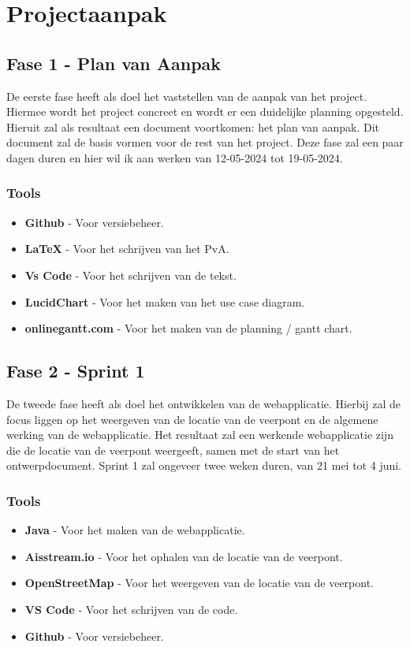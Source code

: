 \documentclass{article}
\begin{document}
\section{Projectaanpak}
\subsection{Fase 1 - Plan van Aanpak}
De eerste fase heeft als doel het vaststellen van de aanpak van het project. Hiermee wordt het project concreet en wordt er een duidelijke planning opgesteld.  
Hieruit zal als resultaat een document voortkomen: het plan van aanpak. Dit document zal de basis vormen voor de rest van het project.
Deze fase zal een paar dagen duren en hier wil ik aan werken van 12-05-2024 tot 19-05-2024.
\subsubsection{Tools}
\begin{itemize}
    \item \textbf{Github} - Voor versiebeheer.
    \item \textbf{LaTeX} - Voor het schrijven van het PvA.
    \item \textbf{Vs Code} - Voor het schrijven van de tekst.
    \item \textbf{LucidChart} - Voor het maken van het use case diagram.
    \item \textbf{onlinegantt.com} - Voor het maken van de planning / gantt chart.
\end{itemize}


\subsection{Fase 2 - Sprint 1}
De tweede fase heeft als doel het ontwikkelen van de webapplicatie. Hierbij zal de focus liggen op het weergeven van de locatie van de veerpont en de algemene werking van de webapplicatie.
Het resultaat zal een werkende webapplicatie zijn die de locatie van de veerpont weergeeft, samen met de start van het ontwerpdocument.
Sprint 1 zal ongeveer twee weken duren, van 21 mei tot 4 juni.
\subsubsection{Tools}
\begin{itemize}
    \item \textbf{Java} - Voor het maken van de webapplicatie.
    \item \textbf{Aisstream.io} - Voor het ophalen van de locatie van de veerpont.
    \item \textbf{OpenStreetMap} - Voor het weergeven van de locatie van de veerpont.
    \item \textbf{VS Code} - Voor het schrijven van de code.
    \item \textbf{Github} - Voor versiebeheer.
\end{itemize}
\end{document}

